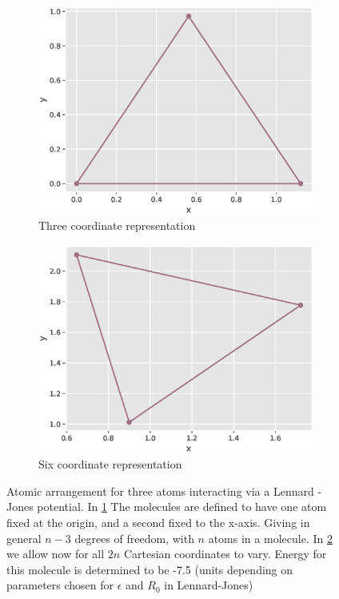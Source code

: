 \documentclass[12pt,a4paper]{article}
\begin{document}
\begin{figure}[ht]
\centering
\begin{subfigure}[t]{0.45\textwidth}
   \includegraphics[width = \linewidth]{images/triangle1.eps}
    \caption{Three coordinate representation}
    \label{fig:tri3}
\end{subfigure}
\begin{subfigure}[t]{0.45\textwidth}
   \includegraphics[width = \linewidth]{images/triangle2.eps}
    \caption{Six coordinate representation}
    \label{fig:tri6}
\end{subfigure}
\caption{Atomic arrangement for three atoms interacting via a Lennard - Jones potential. In \ref{fig:tri3} The molecules are defined to have one atom fixed at the origin, and a second fixed to the x-axis. Giving in general $n-3$ degrees of freedom, with $n$ atoms in a molecule. In \ref{fig:tri6} we allow now for all $2n$ Cartesian coordinates to vary. Energy for this molecule is determined to be -7.5 (units depending on parameters chosen for $\epsilon$ and $R_0$ in Lennard-Jones)}
\label{fig:Optimaltri}
\end{figure}
\end{document}
